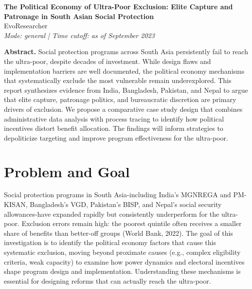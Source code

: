 \documentclass[10pt]{article}
\begin{document}
\begin{center}
{\Large \textbf{The Political Economy of Ultra-Poor Exclusion: Elite Capture and Patronage in South Asian Social Protection}}\\
EvoResearcher\\
\textit{Mode: general | Time cutoff: as of September 2023}
\end{center}

\textbf{Abstract.} Social protection programs across South Asia persistently fail to reach the ultra-poor, despite decades of investment. While design flaws and implementation barriers are well documented, the political economy mechanisms that systematically exclude the most vulnerable remain underexplored. This report synthesizes evidence from India, Bangladesh, Pakistan, and Nepal to argue that elite capture, patronage politics, and bureaucratic discretion are primary drivers of exclusion. We propose a comparative case study design that combines administrative data analysis with process tracing to identify how political incentives distort benefit allocation. The findings will inform strategies to depoliticize targeting and improve program effectiveness for the ultra-poor.

\section*{Problem and Goal}
Social protection programs in South Asia-including India's MGNREGA and PM-KISAN, Bangladesh's VGD, Pakistan's BISP, and Nepal's social security allowances-have expanded rapidly but consistently underperform for the ultra-poor. Exclusion errors remain high: the poorest quintile often receives a smaller share of benefits than better-off groups (World Bank, 2022). The goal of this investigation is to identify the political economy factors that cause this systematic exclusion, moving beyond proximate causes (e.g., complex eligibility criteria, weak capacity) to examine how power dynamics and electoral incentives shape program design and implementation. Understanding these mechanisms is essential for designing reforms that can actually reach the ultra-poor.
\end{document}
